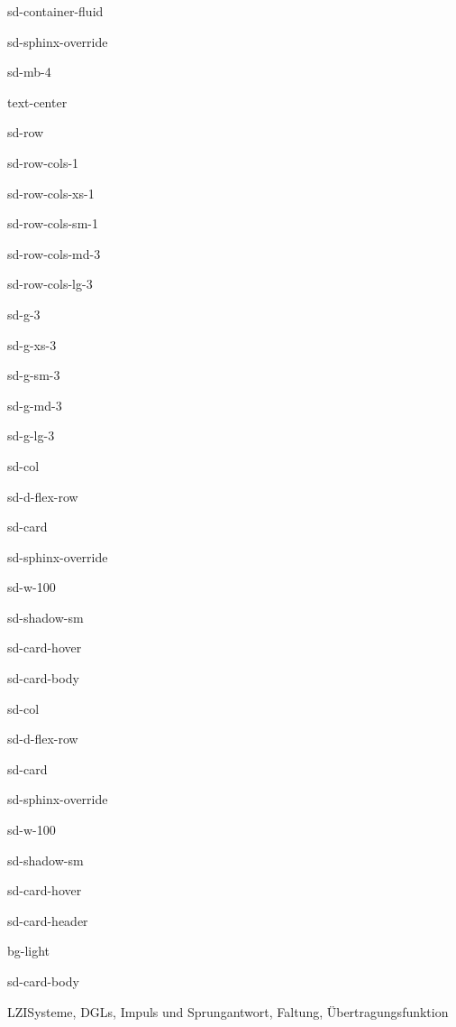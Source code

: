 \documentclass[letterpaper,10pt,english]{jupyterBook}
\let\sphinxpxdimen\pdfpxdimen\else\newdimen\sphinxpxdimen
\begin{document}
\begin{sphinxuseclass}{sd-container-fluid}
\begin{sphinxuseclass}{sd-sphinx-override}
\begin{sphinxuseclass}{sd-mb-4}
\begin{sphinxuseclass}{text-center}
\begin{sphinxuseclass}{sd-row}
\begin{sphinxuseclass}{sd-row-cols-1}
\begin{sphinxuseclass}{sd-row-cols-xs-1}
\begin{sphinxuseclass}{sd-row-cols-sm-1}
\begin{sphinxuseclass}{sd-row-cols-md-3}
\begin{sphinxuseclass}{sd-row-cols-lg-3}
\begin{sphinxuseclass}{sd-g-3}
\begin{sphinxuseclass}{sd-g-xs-3}
\begin{sphinxuseclass}{sd-g-sm-3}
\begin{sphinxuseclass}{sd-g-md-3}
\begin{sphinxuseclass}{sd-g-lg-3}
\begin{sphinxuseclass}{sd-col}
\begin{sphinxuseclass}{sd-d-flex-row}
\begin{sphinxuseclass}{sd-card}
\begin{sphinxuseclass}{sd-sphinx-override}
\begin{sphinxuseclass}{sd-w-100}
\begin{sphinxuseclass}{sd-shadow-sm}
\begin{sphinxuseclass}{sd-card-hover}
\begin{sphinxuseclass}{sd-card-body}
\end{sphinxuseclass}{\hyperref[\detokenize{content/3_FourierAnalyse::doc}]{}}
\end{sphinxuseclass}
\end{sphinxuseclass}
\end{sphinxuseclass}
\end{sphinxuseclass}
\end{sphinxuseclass}
\end{sphinxuseclass}
\end{sphinxuseclass}
\begin{sphinxuseclass}{sd-col}
\begin{sphinxuseclass}{sd-d-flex-row}
\begin{sphinxuseclass}{sd-card}
\begin{sphinxuseclass}{sd-sphinx-override}
\begin{sphinxuseclass}{sd-w-100}
\begin{sphinxuseclass}{sd-shadow-sm}
\begin{sphinxuseclass}{sd-card-hover}
\begin{sphinxuseclass}{sd-card-header}
\begin{sphinxuseclass}{bg-light}
\sphinxAtStartPar
{}

\end{sphinxuseclass}
\end{sphinxuseclass}
\begin{sphinxuseclass}{sd-card-body}
\noindent\sphinxincludegraphics[height=120\sphinxpxdimen]{{bandpass}.png}

\sphinxAtStartPar
LZI\sphinxhyphen{}Systeme, DGLs, Impuls\sphinxhyphen{} und Sprungantwort, Faltung, Übertragungsfunktion


\end{sphinxuseclass}
\end{sphinxuseclass}
\end{sphinxuseclass}
\end{sphinxuseclass}
\end{sphinxuseclass}
\end{sphinxuseclass}
\end{sphinxuseclass}
\end{sphinxuseclass}
\end{sphinxuseclass}
\end{sphinxuseclass}
\end{sphinxuseclass}
\end{sphinxuseclass}
\end{sphinxuseclass}
\end{sphinxuseclass}
\end{sphinxuseclass}
\end{sphinxuseclass}
\end{sphinxuseclass}
\end{sphinxuseclass}
\end{sphinxuseclass}
\end{sphinxuseclass}
\end{sphinxuseclass}
\end{sphinxuseclass}
\end{sphinxuseclass}
\end{document}
